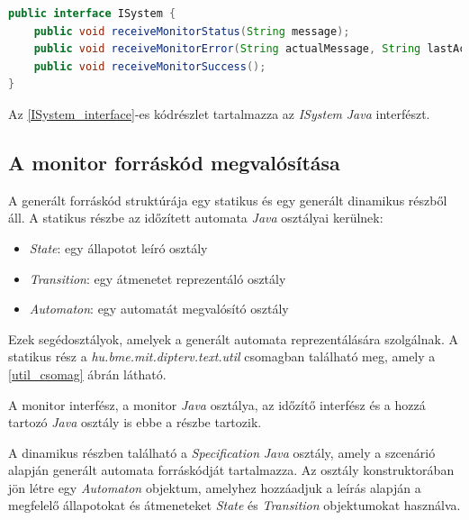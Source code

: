\begin{lstlisting}[language=java,frame=single, float=h!, caption={Rendszer interfész \textit{Java} implementációja.},captionpos=b, label=ISystem_interface]
public interface ISystem {
	public void receiveMonitorStatus(String message);
	public void receiveMonitorError(String actualMessage, String lastAcceptedMessage);
	public void receiveMonitorSuccess();
}
\end{lstlisting}

Az \ref{ISystem_interface}-es kódrészlet tartalmazza az \textit{ISystem} \textit{Java} interfészt.

\subsection{A monitor forráskód megvalósítása}
A generált forráskód struktúrája egy statikus és egy generált dinamikus részből áll.
A statikus részbe az időzített automata \textit{Java} osztályai kerülnek:
\begin{itemize}
    \item \textit{State}: egy állapotot leíró osztály
    \item \textit{Transition}: egy átmenetet reprezentáló osztály
    \item \textit{Automaton}: egy automatát megvalósító osztály
\end{itemize}
Ezek segédosztályok, amelyek a generált automata reprezentálására szolgálnak.
A statikus rész a \textit{hu.bme.mit.dipterv.text.util} csomagban található meg, amely a \ref{util_csomag} ábrán látható.

A monitor interfész, a monitor \textit{Java} osztálya, az időzítő interfész és a hozzá tartozó \textit{Java} osztály is ebbe a részbe tartozik.

A dinamikus részben található a \textit{Specification} \textit{Java} osztály, amely a szcenárió alapján generált automata forráskódját tartalmazza.
Az osztály konstruktorában jön létre egy \textit{Automaton} objektum, amelyhez hozzáadjuk a leírás alapján a megfelelő állapotokat és átmeneteket \textit{State} és \textit{Transition} objektumokat használva.

